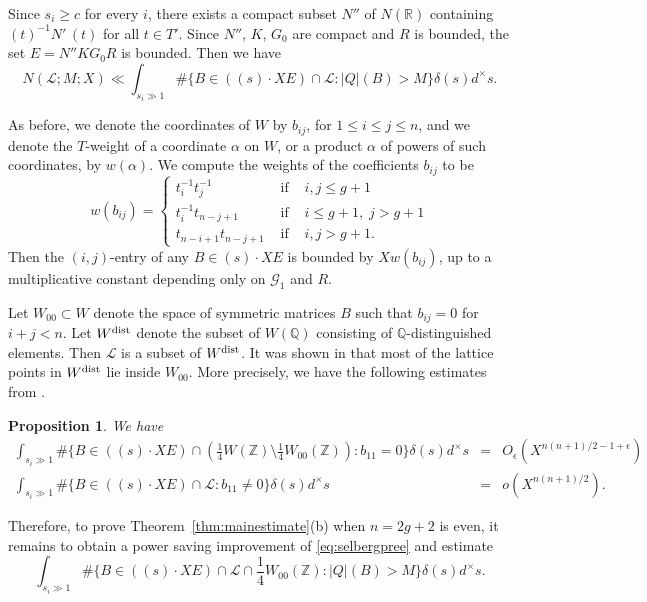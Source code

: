 \documentclass[11pt]{article}
\def\Z{{\mathbb Z}}
\def\dist{{\rm dist}}
\def\R{{\mathbb R}}
\def\Q{{\mathbb Q}}
\def\Z{{\mathbb Z}}
\def\Q{{\mathbb Q}}
\def\GG{{\mathcal G}}
\def\LL{{\mathcal L}}
\newtheorem{proposition}[theorem]{Proposition}
\begin{document}
Since $s_i\geq c$ for every $i$, there exists a compact subset $N''$ of
$N(\R)$ containing $(t)^{-1}N'\,(t)$ for all $t\in T'$. Since $N''$, $K$, $G_0$ are compact and $R$ is bounded, the set $E=N''KG_0R$ is bounded. Then we have
\begin{equation}\label{eq:REe}
N(\LL;M;X)\ll \int_{s_i\gg 1} \#\{B\in((s)\cdot XE)\cap\LL:|Q|(B)>M\}\delta(s)d^\times s.
\end{equation}

As before, we denote the coordinates of $W$ by $b_{ij}$, for $1\leq
i\leq j\leq n$, and we denote
the $T$-weight of a coordinate $\alpha$ on $W$, or a
product $\alpha$ of powers of such coordinates, by $w(\alpha)$.
We compute the weights of the coefficients $b_{ij}$ to be
\begin{equation}\label{wbij2}
w(b_{ij})=\left\{
\begin{array}{rcl}
t_i^{-1}t_j^{-1} &\mbox{ if }& i,j\leq g+1\\
t_i^{-1}t_{n-j+1} &\mbox{ if }& i\leq g+1,\; j>g+1\\
t_{n-i+1}t_{n-j+1} &\mbox{ if }& i,j>g+1.
\end{array}
\right.
\end{equation}
Then the $(i,j)$-entry of any $B\in (s)\cdot XE$ is bounded by $Xw(b_{ij})$, up to a multiplicative constant depending only on $\GG_1$ and $R$.

Let $W_{00}\subset W$ denote the space of symmetric matrices $B$
such that $b_{ij}=0$ for $i+j < n$. Let $W^\dist$ denote the subset of $W(\Q)$ consisting of $\Q$-distinguished elements. Then $\LL$ is a subset of $W^\dist$. It was shown in \cite[\S4.2]{SW}
that most of the lattice points in $W^\dist$ lie inside $W_{00}$. More precisely, we have the following estimates from \cite[Proposition 21 and 23]{SW}.

\begin{proposition}\label{prop:sw6}
We have
\begin{eqnarray}
  \int_{s_i\gg 1} \#\{B\in((s)\cdot XE)\cap({\textstyle\frac14} W(\Z)\setminus{\textstyle\frac14} W_{00}(\Z)):b_{11}=0\}\delta(s)d^\times s &=& O_\epsilon(X^{n(n+1)/2-1+\epsilon}) \\
  \label{eq:selbergpree}\int_{s_i\gg 1} \#\{B\in((s)\cdot XE)\cap\LL:b_{11}\neq 0\}\delta(s)d^\times s &=& o(X^{n(n+1)/2}).
\end{eqnarray}
\end{proposition}

Therefore, to prove Theorem~\ref{thm:mainestimate}(b) when $n=2g+2$ is even, it remains to obtain a power saving improvement of \eqref{eq:selbergpree} and estimate
\begin{equation}\label{eq:Qinve}
\int_{s_i\gg 1} \#\{B\in ((s)\cdot XE)\cap \LL\cap
{\textstyle\frac14} W_{00}(\Z):|Q|(B)>M\}\delta(s)d^\times s.
\end{equation}
\end{document}
